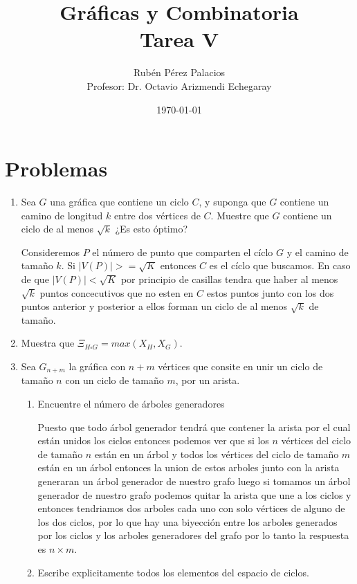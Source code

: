 \documentclass[letterpaper]{article}
\title{Gráficas y Combinatoria\\Tarea V}
\author{Rubén Pérez Palacios\\Profesor: Dr. Octavio Arizmendi Echegaray}
\date{\today}
\newcommand{\abs}[1]{\left| #1 \right| }
\newcommand{\pars}[1]{\left( #1 \right) }
\newcommand{\1}{\mathbbm{1}}
\begin{document}
	\maketitle
    
    \section*{Problemas}

    \begin{enumerate}
		
		\item Sea $G$ una gráfica que contiene un ciclo $C$, y suponga que $G$ contiene un camino de longitud $k$ entre dos vértices de $C$. Muestre que $G$ contiene un ciclo de al menos $\sqrt{k}$ ¿Es esto óptimo?
		
		Consideremos $P$ el número de punto que comparten el cíclo $G$ y el camino de tamaño $k$. Si $\abs{V\pars{P}} >= \sqrt{K}$ entonces $C$ es el cíclo que buscamos. En caso de que $\abs{V\pars{P}} < \sqrt{K}$ por principio de casillas tendra que haber al menos $\sqrt{k}$ puntos concecutivos que no esten en $C$ estos puntos junto con los dos puntos anterior y posterior a ellos forman un ciclo de al menos $\sqrt{k}$ de tamaño.

		\item Muestra que $\Xi_{H\square G} = max(X_H,X_G)$.
		
		\item Sea $G_{n+m}$ la gráfica con $n+m$ vértices que consite en unir un ciclo de tamaño $n$ con un ciclo de tamaño $m$, por un arista.
		
		\begin{enumerate}
			\item Encuentre el número de árboles generadores
			
			Puesto que todo árbol generador tendrá que contener la arista por el cual están unidos los ciclos entonces podemos ver que si los $n$ vértices del ciclo de tamaño $n$ están en un árbol y todos los vértices del ciclo de tamaño $m$ están en un árbol entonces la union de estos arboles junto con la arista generaran un árbol generador de nuestro grafo luego si tomamos un árbol generador de nuestro grafo podemos quitar la arista que une a los ciclos y entonces tendriamos dos arboles cada uno con solo vértices de alguno de los dos ciclos, por lo que hay una biyección entre los arboles generados por los ciclos y los arboles generadores del grafo por lo tanto la respuesta es $n\times m$.

			\item Escribe explicitamente todos los elementos del espacio de ciclos.
			

\end{enumerate}
\end{enumerate}
\end{document}
